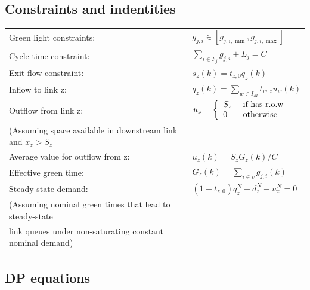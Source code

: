 \documentclass[11pt]{article}
\begin{document}
\subsection{Constraints and indentities}
\begin{tabular}{ l l }
Green light constraints: & $g_{j,i} \in \left[g_{j, i, \min }, g_{j, i, \max }\right]$ \\
Cycle time constraint: & $\sum_{i \in F_{j}} g_{j, i}+L_{j}=C$ \\
Exit flow constraint: & $s_{z}(k)=t_{z, 0} q_{z}(k)$ \\
Inflow to link z: & $q_{z}(k)= \sum_{w \in I_{M}} t_{w, z} u_{w}(k)$ \\
Outflow from link z: & $u_z = \left\{ \begin{array} { l l } { S_z } & { \text { if  has r.o.w}  } \\ { 0 } & { \text { otherwise} } \end{array} \right.$ \\
(Assuming space available in downstream link and $x_z>S_z$\\
Average value for outflow from z: & $u_{z}(k)=S_{z} G_{z}(k) / C$\\
Effective green time: & $G_{z}(k)=\sum_{i \in v} g_{j, i}(k)$ \\
Steady state demand: & $\left(1-t_{z, 0}\right) q_{z}^{N}+d_{z}^{N}-u_{z}^{N}=0$ \\
(Assuming nominal green times that lead to steady-state \\
link queues under non-saturating constant nominal demand) \\
\end{tabular}


\subsection{DP equations}
\end{document}
